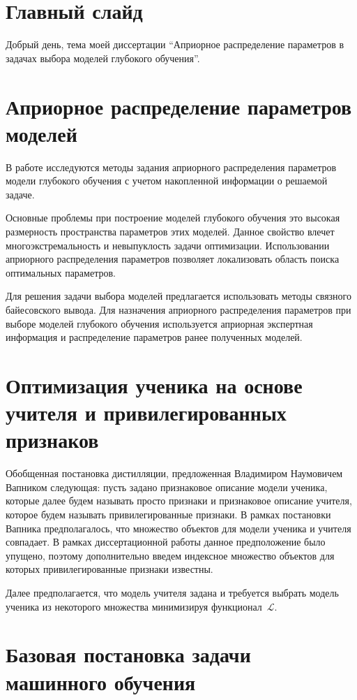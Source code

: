\documentclass[12pt, twoside]{article}
\begin{document}
\section{Главный слайд}
Добрый день, тема моей диссертации ``Априорное распределение параметров в задачах выбора моделей глубокого обучения''.

\section{Априорное распределение параметров моделей}
В работе исследуются методы задания априорного распределения параметров модели глубокого обучения с учетом накопленной информации о решаемой задаче.

Основные проблемы при построение моделей глубокого обучения это высокая размерность пространства параметров этих моделей. Данное свойство влечет многоэкстремальность и невыпуклость задачи оптимизации. Использовании априорного распределения параметров позволяет локализовать область поиска оптимальных параметров.

Для решения задачи выбора моделей предлагается использовать методы связного байесовского вывода. Для назначения априорного распределения параметров при выборе моделей глубокого обучения используется априорная экспертная информация и распределение параметров ранее полученных моделей.

\section{Оптимизация ученика на основе учителя и привилегированных признаков}
Обобщенная постановка дистилляции, предложенная Владимиром Наумовичем Вапником следующая: пусть задано признаковое описание модели ученика, которые далее будем называть просто признаки и признаковое описание учителя, которое будем называть привилегированные признаки. В рамках постановки Вапника предполагалось, что множество объектов для модели ученика и учителя совпадает. В рамках диссертационной работы данное предположение было упущено, поэтому дополнительно введем индексное множество объектов для которых привилегированные признаки известны.

Далее предполагается, что модель учителя задана и требуется выбрать модель ученика из некоторого множества минимизируя функционал~$\mathcal{L}$.

\section{Базовая постановка задачи машинного обучения}
\end{document}
